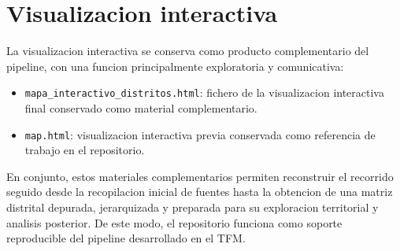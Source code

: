 \section{Visualizacion interactiva}

La visualizacion interactiva se conserva como producto complementario del pipeline, con una funcion principalmente exploratoria y comunicativa:

\begin{itemize}
    \item \texttt{mapa\_interactivo\_distritos.html}: fichero de la visualizacion interactiva final conservado como material complementario.
    \item \texttt{map.html}: visualizacion interactiva previa conservada como referencia de trabajo en el repositorio.
\end{itemize}

En conjunto, estos materiales complementarios permiten reconstruir el recorrido seguido desde la recopilacion inicial de fuentes hasta la obtencion de una matriz distrital depurada, jerarquizada y preparada para su exploracion territorial y analisis posterior. De este modo, el repositorio funciona como soporte reproducible del pipeline desarrollado en el TFM.

